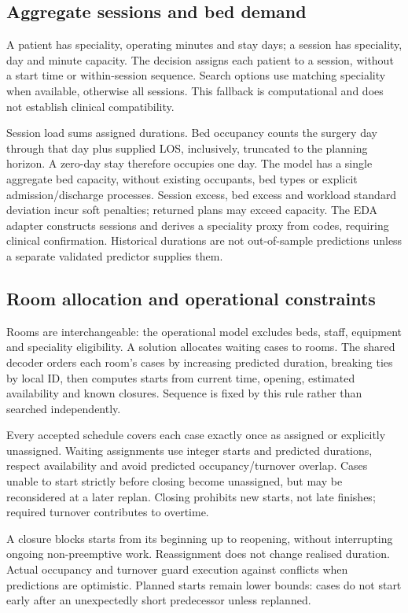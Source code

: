 \subsection{Aggregate sessions and bed demand}

A patient has speciality, operating minutes and stay days; a session has
speciality, day and minute capacity. The decision assigns each patient to a
session, without a start time or within-session sequence. Search options use
matching speciality when available, otherwise all sessions. This fallback
is computational and does not establish clinical compatibility.

Session load sums assigned durations. Bed occupancy counts the surgery day
through that day plus supplied LOS, inclusively, truncated to the planning
horizon. A zero-day stay therefore occupies one day. The model has a single
aggregate bed capacity, without existing occupants, bed types or explicit
admission/discharge processes. Session excess, bed excess and workload
standard deviation incur soft penalties; returned plans may exceed capacity.
The EDA adapter constructs sessions and derives a speciality proxy from codes,
requiring clinical confirmation. Historical durations are not out-of-sample
predictions unless a separate validated predictor supplies them.

\subsection{Room allocation and operational constraints}

Rooms are interchangeable: the operational model excludes beds, staff,
equipment and speciality eligibility. A solution allocates waiting cases to
rooms. The shared decoder orders each room's cases by increasing predicted
duration, breaking ties by local ID, then computes starts from current time,
opening, estimated availability and known closures. Sequence is fixed by
this rule rather than searched independently.

Every accepted schedule covers each case exactly once as assigned or
explicitly unassigned. Waiting assignments use integer starts and predicted
durations, respect availability and avoid predicted occupancy/turnover
overlap. Cases unable to start strictly before closing become unassigned,
but may be reconsidered at a later replan. Closing prohibits new starts,
not late finishes; required turnover contributes to overtime.

A closure blocks starts from its beginning up to reopening, without
interrupting ongoing non-preemptive work. Reassignment does not change realised
duration. Actual occupancy and turnover guard execution against conflicts
when predictions are optimistic. Planned starts remain lower bounds: cases
do not start early after an unexpectedly short predecessor unless replanned.

